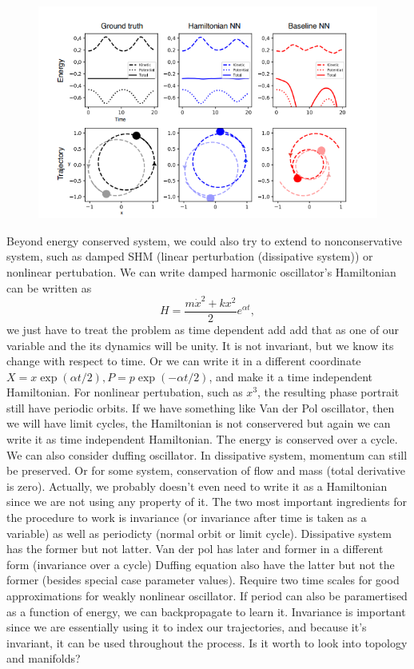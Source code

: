 \documentclass{article}
\begin{document}
\begin{figure}[H]
  \includegraphics[width=\linewidth]{twobody.png}
  \centering
\end{figure}

Beyond energy conserved system, we could also try to extend to nonconservative system, such as damped SHM (linear perturbation (dissipative system)) or nonlinear pertubation.
We can write damped harmonic oscillator's Hamiltonian can be written as $$
H=\frac{m \dot{x}^{2}+k x^{2}}{2} e^{\alpha t}, 
$$ 
we just have to treat the problem as time dependent add add that as one of our variable and the its dynamics will be unity.
It is not invariant, but we know its change with respect to time.
Or we can write it in a different coordinate $X=x\exp(\alpha t/2), P = p\exp(-\alpha t/2)$, and make it a time independent Hamiltonian.
For nonlinear pertubation, such as $x^3$, the resulting phase portrait still have periodic orbits.
If we have something like Van der Pol oscillator, then we will have limit cycles, the Hamiltonian is not conservered but again we can write it as time independent Hamiltonian.
The energy is conserved over a cycle.
We can also consider duffing oscillator.
In dissipative system, momentum can still be preserved. 
Or for some system, conservation of flow and mass (total derivative is zero).
Actually, we probably doesn't even need to write it as a Hamiltonian since we are not using any property of it.
The two most important ingredients for the procedure to work is invariance (or invariance after time is taken as a variable) as well as periodicty (normal orbit or limit cycle).
Dissipative system has the former but not latter.
Van der pol has later and former in a different form (invariance over a cycle)
Duffing equation also have the latter but not the former (besides special case parameter values). 
Require two time scales for good approximations for weakly nonlinear oscillator.
If period can also be paramertised as a function of energy, we can backpropagate to learn it.
Invariance is important since we are essentially using it to index our trajectories, and because it's invariant, it can be used throughout the process. 
Is it worth to look into topology and manifolds?
\end{document}
